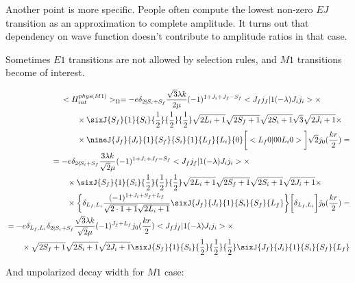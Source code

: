 Another point is more specific. People often compute the lowest non-zero $EJ$ transition as an approximation to complete amplitude. It turns out that dependency on wave function doesn't contribute to amplitude ratios in that case.

Sometimes $E1$ transitions are not allowed by selection rules, and $M1$ transitions become of interest.

\begin{align}
    \begin{split}
        &<H_{int}^{phys (M1)}>_\Omega = -e \delta_{2 \nmid S_i + S_f} \frac{\sqrt{3} \lambda k}{2 \mu} (-1)^{1+J_i+J_f - S_f} <J_f j_f | 1 (-\lambda) J_i j_i> \times \\
        &\qquad\times \sixJ{S_f}{1}{S_i}{\frac{1}{2}}{\frac{1}{2}}{\frac{1}{2}} \sqrt{2L_i + 1} \sqrt{2S_f + 1} \sqrt{2S_i+1} \sqrt{3} \sqrt{2J_i + 1} \times \\
        &\qquad\times \nineJ{J_f}{J_i}{1}{S_f}{S_i}{1}{L_f}{L_i}{0} \bigg[ <L_f 0 | 0 0 L_i 0> \bigg] \sqrt{2} j_{0}(\frac{kr}{2}) = 
    \end{split} \\
    \begin{split}
        &= -e \delta_{2 \nmid S_i + S_f} \frac{3 \lambda k}{\sqrt{2} \mu} (-1)^{1+J_i+J_f - S_f} <J_f j_f | 1 (-\lambda) J_i j_i> \times \\
        &\qquad\times \sixJ{S_f}{1}{S_i}{\frac{1}{2}}{\frac{1}{2}}{\frac{1}{2}} \sqrt{2L_i + 1} \sqrt{2S_f + 1} \sqrt{2S_i+1} \sqrt{2J_i + 1} \times \\
        &\qquad\times \bigg\{ \delta_{L_f, L_i} \frac{(-1)^{1+J_i+S_f+L_f}}{\sqrt{2 \cdot 1+1}\sqrt{2L_i + 1}} \sixJ{J_f}{J_i}{1}{S_i}{S_f}{L_f} \bigg\} \bigg[ \delta_{L_f, L_i} \bigg] j_{0}(\frac{kr}{2}) =
    \end{split} \\
    \begin{split}
        &= -e \delta_{L_f, L_i} \delta_{2 \nmid S_i + S_f} \frac{\sqrt{3} \lambda k}{\sqrt{2} \mu} (-1)^{J_f + L_f} j_{0}(\frac{kr}{2}) <J_f j_f | 1 (-\lambda) J_i j_i> \times \\
        &\qquad\times \sqrt{2S_f + 1} \sqrt{2S_i+1} \sqrt{2J_i + 1} \sixJ{S_f}{1}{S_i}{\frac{1}{2}}{\frac{1}{2}}{\frac{1}{2}} \sixJ{J_f}{J_i}{1}{S_i}{S_f}{L_f}
    \end{split}
\end{align}

And unpolarized decay width for $M1$ case:

